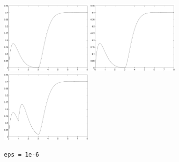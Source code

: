 \documentclass{ximera}
\begin{document}
\begin{computerExercise}
\begin{solution}
\begin{figure}[htb]
                       \centerline{%
                       \includegraphics[width=1.8in]{exfigure/13-4-5a.pdf}
                       \includegraphics[width=1.8in]{exfigure/13-4-5b.pdf}
                       \includegraphics[width=1.8in]{exfigure/13-4-5c.pdf}}
                \centerline{{\tt eps = 1e-6}\hspace{1.2in}{\tt eps = 1e-8}
\hspace{1.2in}{\tt eps = 1e-10}}
\end{figure}



\end{solution}
\end{computerExercise}
\end{document}
